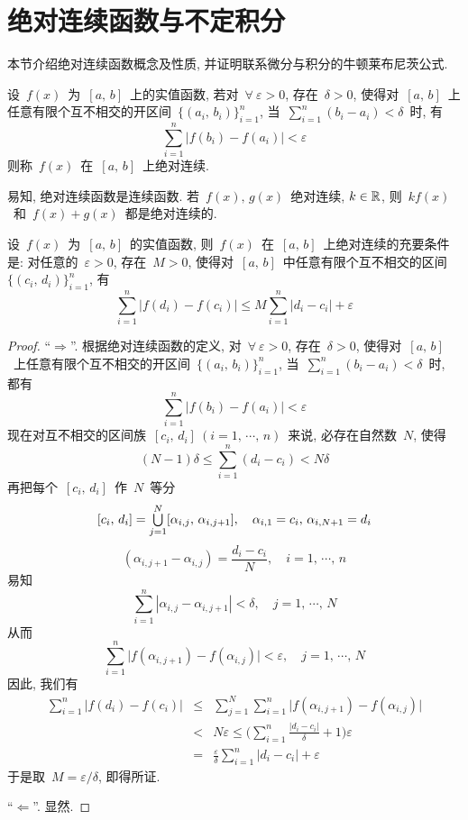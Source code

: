 \section{绝对连续函数与不定积分}

本节介绍绝对连续函数概念及性质, 并证明联系微分与积分的牛顿\raisebox{0.5mm}{--}莱布尼茨公式.

\begin{definition}
设~$f(x)$~为~$[a,\,b]$~上的实值函数, 若对~$\forall~\varepsilon > 0$, 存在~$\delta > 0$, 使得对~$[a,\,b]$~上任意有限个互不相交的开区间~$\big\{(a_i,\,b_i)\big\}_{i=1}^n$, 当~$\sum\limits_{i=1}^n (b_i-a_i) < \delta$~时, 有
\[
\sum_{i=1}^n \big| f(b_i)-f(a_i) \big| < \varepsilon
\]
则称~$f(x)$~在~$[a,\,b]$~上绝对连续.
\end{definition}

易知, 绝对连续函数是连续函数. 若~$f(x),\,g(x)$~绝对连续, $k \in \mathbb{R}$, 则~$kf(x)$~和~$f(x)+g(x)$~都是绝对连续的.

\begin{proposition}[绝对连续函数与利普希兹条件的同型描述]
设~$f(x)$~为~$[a,\,b]$~的实值函数, 则~$f(x)$~在~$[a,\,b]$~上绝对连续的充要条件是: 对任意的~$\varepsilon > 0$, 存在~$M > 0$, 使得对~$[a,\,b]$~中任意有限个互不相交的区间~$\big\{(c_i,\,d_i)\big\}_{i=1}^n$, 有
\[
\sum_{i=1}^n \big| f(d_i)-f(c_i)\big| \leqslant M \sum_{i=1}^n |d_i - c_i| + \varepsilon
\]
\end{proposition}

\begin{proof}
``$\Rightarrow$''. 根据绝对连续函数的定义, 对~$\forall~\varepsilon > 0$, 存在~$\delta > 0$, 使得对~$[a,\,b]$~上任意有限个互不相交的开区间~$\big\{(a_i,\,b_i)\big\}_{i=1}^n$, 当~$\sum\limits_{i=1}^n (b_i-a_i) < \delta$~时, 都有
\[
\sum_{i=1}^n \big| f(b_i)-f(a_i) \big| < \varepsilon
\]
现在对互不相交的区间族~$[c_i,\,d_i]~(i=1,\,\cdots,\,n)$~来说, 必存在自然数~$N$, 使得
\[
(N-1)\delta \leqslant \sum_{i=1}^n (d_i - c_i) < N \delta
\]
再把每个~$[c_i,\,d_i]$~作~$N$~等分
\[
[c_i,\,d_i] = \mathop{\textstyle{\bigcup}}_{j=1}^N [\alpha_{i,j},\,\alpha_{i,j+1}], \quad \alpha_{i,1}=c_i, \, \alpha_{i,N+1}=d_i
\]
\[
(\alpha_{i,j+1}-\alpha_{i,j})=\frac{d_i-c_i}{N}, \quad i=1,\,\cdots,\,n
\]
易知
\[
\sum_{i=1}^n |\alpha_{i,j}-\alpha_{i,j+1}| < \delta, \quad j=1,\,\cdots,\,N
\]
从而
\[
\sum_{i=1}^n \big| f(\alpha_{i,j+1})-f(\alpha_{i,j})\big| < \varepsilon, \quad j=1,\,\cdots,\,N
\]
因此, 我们有
\begin{eqnarray*}
\sum_{i=1}^n \big|f(d_i)-f(c_i)\big| &\leqslant& \sum_{j=1}^N \sum_{i=1}^n \big| f(\alpha_{i,j+1})-f(\alpha_{i,j})\big| \\
&<& N \varepsilon \leqslant \Big( \sum_{i=1}^n \frac{|d_i-c_i|}{\delta}+1 \Big) \varepsilon \\
&=& \frac{\varepsilon}{\delta}\sum_{i=1}^n |d_i-c_i| + \varepsilon
\end{eqnarray*}
于是取~$M = \varepsilon/\delta$, 即得所证.

``$\Leftarrow$''. 显然.
\end{proof}

